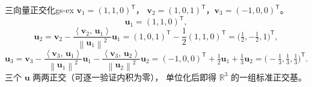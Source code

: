 \documentclass[11pt,a4paper,openany]{ctexbook}
\newcommand{\norm}[1]{\left\lVert #1 \right\rVert}
\newcommand{\ip}[2]{\left\langle #1,\,#2 \right\rangle}
\newcommand{\Rnum}[1]{\mathbb{R}^{#1}}
\begin{document}
\begin{exmp}{三向量正交化}{gs-ex}
$\boldsymbol{v}_1=(1,1,0)^{\mathsf T}$，
$\boldsymbol{v}_2=(1,0,1)^{\mathsf T}$，$\boldsymbol{v}_3=(-1,0,0)^{\mathsf T}$。
\[
\boldsymbol{u}_1=(1,1,0)^{\mathsf T},
\]
\[
\boldsymbol{u}_2=\boldsymbol{v}_2-\frac{\ip{\boldsymbol{v}_2}{\boldsymbol{u}_1}}
{\norm{\boldsymbol{u}_1}^{2}}\boldsymbol{u}_1
=(1,0,1)^{\mathsf T}-\frac{1}{2}(1,1,0)^{\mathsf T}
=\Big(\tfrac12,-\tfrac12,1\Big)^{\mathsf T},
\]
\[
\boldsymbol{u}_3=\boldsymbol{v}_3
-\frac{\ip{\boldsymbol{v}_3}{\boldsymbol{u}_1}}{\norm{\boldsymbol{u}_1}^{2}}\boldsymbol{u}_1
-\frac{\ip{\boldsymbol{v}_3}{\boldsymbol{u}_2}}{\norm{\boldsymbol{u}_2}^{2}}\boldsymbol{u}_2
=(-1,0,0)^{\mathsf T}+\tfrac12\boldsymbol{u}_1+\tfrac13\boldsymbol{u}_2
=\Big(-\tfrac13,\tfrac13,\tfrac13\Big)^{\mathsf T}.
\]
三个 $\boldsymbol{u}$ 两两正交（可逐一验证内积为零），
单位化后即得 $\Rnum{3}$ 的一组标准正交基。
\end{exmp}
\end{document}
